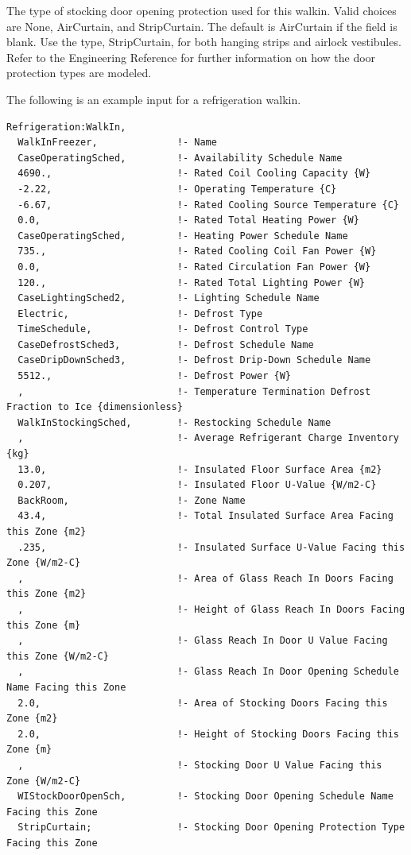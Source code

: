 The type of stocking door opening protection used for this walkin. Valid choices are None, AirCurtain, and StripCurtain. The default is AirCurtain if the field is blank. Use the type, StripCurtain, for both hanging strips and airlock vestibules. Refer to the Engineering Reference for further information on how the door protection types are modeled.

The following is an example input for a refrigeration walkin.

\begin{lstlisting}
Refrigeration:WalkIn,
  WalkInFreezer,              !- Name
  CaseOperatingSched,         !- Availability Schedule Name
  4690.,                      !- Rated Coil Cooling Capacity {W}
  -2.22,                      !- Operating Temperature {C}
  -6.67,                      !- Rated Cooling Source Temperature {C}
  0.0,                        !- Rated Total Heating Power {W}
  CaseOperatingSched,         !- Heating Power Schedule Name
  735.,                       !- Rated Cooling Coil Fan Power {W}
  0.0,                        !- Rated Circulation Fan Power {W}
  120.,                       !- Rated Total Lighting Power {W}
  CaseLightingSched2,         !- Lighting Schedule Name
  Electric,                   !- Defrost Type
  TimeSchedule,               !- Defrost Control Type
  CaseDefrostSched3,          !- Defrost Schedule Name
  CaseDripDownSched3,         !- Defrost Drip-Down Schedule Name
  5512.,                      !- Defrost Power {W}
  ,                           !- Temperature Termination Defrost Fraction to Ice {dimensionless}
  WalkInStockingSched,        !- Restocking Schedule Name
  ,                           !- Average Refrigerant Charge Inventory {kg}
  13.0,                       !- Insulated Floor Surface Area {m2}
  0.207,                      !- Insulated Floor U-Value {W/m2-C}
  BackRoom,                   !- Zone Name
  43.4,                       !- Total Insulated Surface Area Facing this Zone {m2}
  .235,                       !- Insulated Surface U-Value Facing this Zone {W/m2-C}
  ,                           !- Area of Glass Reach In Doors Facing this Zone {m2}
  ,                           !- Height of Glass Reach In Doors Facing this Zone {m}
  ,                           !- Glass Reach In Door U Value Facing this Zone {W/m2-C}
  ,                           !- Glass Reach In Door Opening Schedule Name Facing this Zone
  2.0,                        !- Area of Stocking Doors Facing this Zone {m2}
  2.0,                        !- Height of Stocking Doors Facing this Zone {m}
  ,                           !- Stocking Door U Value Facing this Zone {W/m2-C}
  WIStockDoorOpenSch,         !- Stocking Door Opening Schedule Name Facing this Zone
  StripCurtain;               !- Stocking Door Opening Protection Type Facing this Zone
\end{lstlisting}

